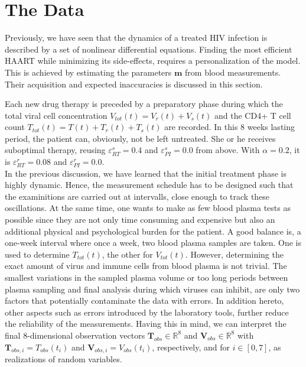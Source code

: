 \section{The Data}
\label{sec:data}

Previously, we have seen that the dynamics of a treated HIV infection is described by a set of nonlinear differential equations.
Finding the most efficient HAART while minimizing its side-effects, requires a personalization of the model.
This is achieved by estimating the parameters $\mathbf{m}$ from blood measurements.
Their acquisition and expected inaccuracies is discussed in this section.\par
Each new drug therapy is preceded by a preparatory phase during which the total viral cell concentration $V_{tot}(t) = V_r(t) + V_s(t)$ and the CD4+ T cell count $T_{tot}(t) = T(t) + T_r(t) + T_s(t)$ are recorded.
In this 8 weeks lasting period, the patient can, obviously, not be left untreated. 
She or he receives suboptimal therapy, reusing $\varepsilon_{RT}^s = 0.4$ and $\varepsilon_{PI}^s = 0.0$ from above.
With $\alpha = 0.2$, it is $\varepsilon_{RT}^r = 0.08$ and $\varepsilon_{PI}^r = 0.0$.\\
In the previous discussion, we have learned that the initial treatment phase is highly dynamic.
Hence, the measurement schedule has to be designed such that the examinitions are carried out at intervalls, close enough to track these oscillations.
At the same time, one wants to make as few blood plasma tests as possible since they are not only time consuming and expensive but also an additional physical and psychological burden for the patient.
A good balance is, a one-week interval where once a week, two blood plasma samples are taken.
One is used to determine $T_{tot}(t)$, the other for $V_{tot}(t)$.\newline
However, determining the exact amount of virus and immune cells from blood plasma is not trivial.
The smallest variations in the sampled plasma volume or too long periods between plasma sampling and final analysis during which viruses can inhibit, are only two factors that potentially contaminate the data with errors.
In addition hereto, other aspects such as errors introduced by the laboratory tools, further reduce the reliability of the measurements.
Having this in mind, we can interpret the final $8$-dimensional observation vectors $\mathbf{T}_{obs} \in \mathbb{R}^8$ and $\mathbf{V}_{obs} \in \mathbb{R}^8$ with $\mathbf{T}_{obs,i} = T_{obs}(t_i)$ and $\mathbf{V}_{obs,i} = V_{obs}(t_i)$, respectively, and for $i \in [0,7]$, as realizations of random variables.
